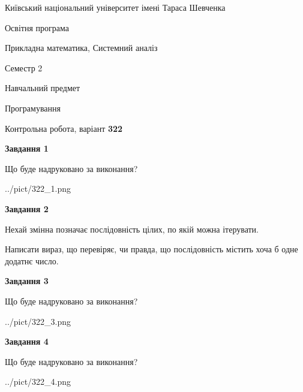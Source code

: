 \documentclass[12pt, ukrainian]{article}
\begin{document}
{{\begin {small}\par
{ \center  Київський національний університет імені Тараса Шевченка \par}
{\parbox {5 cm}{Освітня програма \hfill}{\parbox {8 cm}{Прикладна математика, Системний аналіз \hfill}}\parbox {5 cm}{\hfill Семестр 2}}\par
{\parbox {5 cm} {Навчальний предмет \hfill}\parbox {7 cm}{Програмування \hfill}\parbox {6cm}{\hfill}\par}\vspace{-7pt} \end{small}}{\center Контрольна робота, варіант  \No \textbf
{ 322 }\par}}
{
\begin {large}
{\begin {center}\textbf{Завдання 1}\end {center}}\par
Що буде надруковано за виконання?\par\par
\begin{center}
	{../pict/322_1.png}
\end{center}
\newpage

{\begin {center}\textbf{Завдання 2}\end {center}}\par
Нехай змінна  позначає послідовність цілих, по якій можна ітерувати.

Написати вираз, що перевіряє, чи правда, що послідовність  містить хоча б одне додатнє число.\par
\newpage

{\begin {center}\textbf{Завдання 3}\end {center}}\par
Що буде надруковано за виконання?
\begin{center}
	{../pict/322_3.png}
\end{center}
\newpage

{\begin {center}\textbf{Завдання 4}\end {center}}\par
Що буде надруковано за виконання?\par
\begin{center}
	{../pict/322_4.png}
\end{center}
\newpage


\end{large}}
\end{document}
